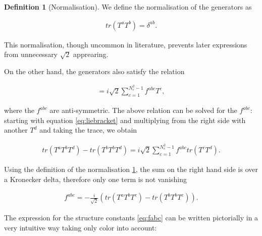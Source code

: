 \documentclass{article}
\theoremstyle{definition}
\newtheorem{definition}{Definition}[section]
\numberwithin{equation}{section}
\begin{document}
\begin{definition}[Normalisation]
\label{def:normalisation}
We define the normalisation of the generators as

\begin{align}
    tr (T^a T^b) = \delta^{ab}. \label{eq:normalisation}
\end{align}

This normalisation, though uncommon in literature, prevents later expressions from unnecessary $\sqrt{2}$ apprearing.

\end{definition}

On the other hand, the generators also satisfy the relation

\begin{align}
    [ T^a, T^b ] = i \sqrt{2} \sum_{c=1}^{N_c^2 - 1} f^{abc} T^c, \label{eq:liebracket}
\end{align}

where the $f^{abc}$ are anti-symmetric. The above relation can be solved for the $f^{abc}$: starting with equation \eqref{eq:liebracket} and multiplying from the right side with another $T^d$ and taking the trace, we obtain

\begin{align}
    tr (T^a T^b T^d) - tr(T^b T^b T^d)  = i \sqrt{2} \sum_{c=1}^{N_c^2 - 1} f^{abc} tr (T^c T^d).
\end{align}

Using the definition of the normalisation \ref{def:normalisation}, the sum on the right hand side is over a Kronecker delta, therefore only one term is not vanishing

\begin{align}
    f^{abc} = -\frac{i}{\sqrt{2}} \left( tr (T^a T^b T^c) - tr(T^b T^b T^c) \right). \label{eq:fabc}
\end{align}

The expression for the structure constants \eqref{eq:fabc} can be written pictorially in a very intuitive way taking only color into account:
\end{document}
